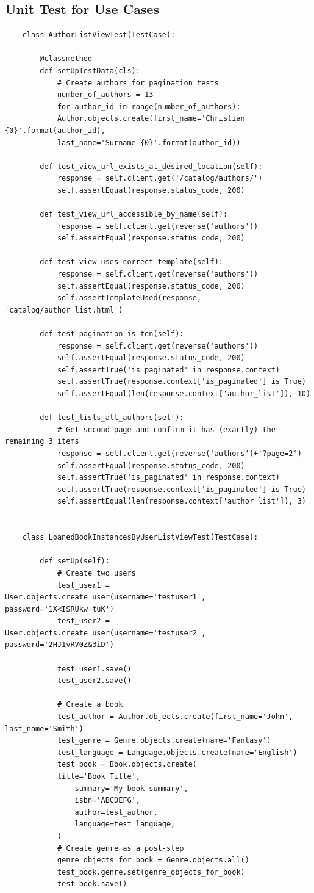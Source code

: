 \documentclass[12pt, a4paper]{report}
\begin{document}
\subsection{Unit Test for Use Cases}
\begin{lstlisting}
	class AuthorListViewTest(TestCase):
	
		@classmethod
		def setUpTestData(cls):
			# Create authors for pagination tests
			number_of_authors = 13
			for author_id in range(number_of_authors):
			Author.objects.create(first_name='Christian {0}'.format(author_id),
			last_name='Surname {0}'.format(author_id))
	
		def test_view_url_exists_at_desired_location(self):
			response = self.client.get('/catalog/authors/')
			self.assertEqual(response.status_code, 200)
	
		def test_view_url_accessible_by_name(self):
			response = self.client.get(reverse('authors'))
			self.assertEqual(response.status_code, 200)
	
		def test_view_uses_correct_template(self):
			response = self.client.get(reverse('authors'))
			self.assertEqual(response.status_code, 200)
			self.assertTemplateUsed(response, 'catalog/author_list.html')
	
		def test_pagination_is_ten(self):
			response = self.client.get(reverse('authors'))
			self.assertEqual(response.status_code, 200)
			self.assertTrue('is_paginated' in response.context)
			self.assertTrue(response.context['is_paginated'] is True)
			self.assertEqual(len(response.context['author_list']), 10)
	
		def test_lists_all_authors(self):
			# Get second page and confirm it has (exactly) the remaining 3 items
			response = self.client.get(reverse('authors')+'?page=2')
			self.assertEqual(response.status_code, 200)
			self.assertTrue('is_paginated' in response.context)
			self.assertTrue(response.context['is_paginated'] is True)
			self.assertEqual(len(response.context['author_list']), 3)
			
	
	class LoanedBookInstancesByUserListViewTest(TestCase):
	
		def setUp(self):
			# Create two users
			test_user1 = User.objects.create_user(username='testuser1', password='1X<ISRUkw+tuK')
			test_user2 = User.objects.create_user(username='testuser2', password='2HJ1vRV0Z&3iD')
	
			test_user1.save()
			test_user2.save()
	
			# Create a book
			test_author = Author.objects.create(first_name='John', last_name='Smith')
			test_genre = Genre.objects.create(name='Fantasy')
			test_language = Language.objects.create(name='English')
			test_book = Book.objects.create(
			title='Book Title',
				summary='My book summary',
				isbn='ABCDEFG',
				author=test_author,
				language=test_language,
			)
			# Create genre as a post-step
			genre_objects_for_book = Genre.objects.all()
			test_book.genre.set(genre_objects_for_book)
			test_book.save()
	

\end{lstlisting}
\end{document}
